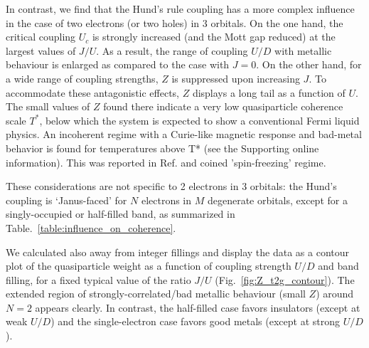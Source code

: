 \documentclass[aps,prl,amsmath, amssymb, english, aps, prl, onecolumn,
  reprint,floatfix, superscriptaddress]{revtex4-1}
\begin{document}
In contrast, we find that the Hund's rule coupling has a more complex
influence in the case of two electrons (or two holes) in $3$
orbitals. On the one hand, the critical coupling $U_c$ is strongly
increased (and the Mott gap reduced) at the largest values of $J/U$.
As a result, the range of coupling $U/D$ with metallic behaviour is
enlarged as compared to the case with $J=0$. On the other hand, for a
wide range of coupling strengths, $Z$ is suppressed upon increasing
$J$\cite{mravlje11,pruschke05,lombardo_Hund_prb_2005}.
To accommodate these antagonistic effects, $Z$ displays a long tail as
a function of $U$. 
The small values of $Z$ found there indicate a very low quasiparticle coherence scale  $T^*$, below which 
the system is expected to show a conventional Fermi liquid physics.
An incoherent regime with a Curie-like magnetic response\cite{werner08} and 
bad-metal behavior \cite{werner08,mravlje11} is found for temperatures above T* (see 
the Supporting online information\cite{Janus_Supp}). This was reported in Ref. \cite{werner08} and coined 'spin-freezing' 
regime.

%
These considerations are not specific to
2 electrons in 3 orbitals: the Hund's coupling is `Janus-faced' for
$N$ electrons in $M$ degenerate orbitals, except for a singly-occupied
or half-filled band, as summarized in
Table.~\ref{table:influence_on_coherence}.

We calculated also away from integer fillings and display the data as
a contour plot of the quasiparticle weight as a function of coupling
strength $U/D$ and band filling, for a fixed typical value of the
ratio $J/U$ (Fig.~\ref{fig:Z_t2g_contour}).  The extended region of
strongly-correlated/bad metallic behaviour (small $Z$) around $N=2$
appears clearly.  In contrast, the half-filled case favors insulators
(except at weak $U/D$) and the single-electron case favors good metals
(except at strong $U/D$).
\end{document}
